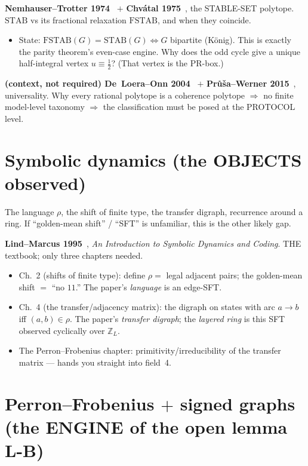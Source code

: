 \textbf{Nemhauser--Trotter 1974}~\cite{NemhauserTrotter1974} $+$ \textbf{Chv\'atal
1975}~\cite{Chvatal1975}, the STABLE-SET polytope. $\mathrm{STAB}$ vs its fractional
relaxation $\mathrm{FSTAB}$, and when they coincide.
\begin{itemize}[itemsep=1pt]
  \item State: $\mathrm{FSTAB}(G)=\mathrm{STAB}(G)\Leftrightarrow G$ bipartite
    (K\"onig). This is exactly the parity theorem's even-case engine. Why does the
    odd cycle give a unique half-integral vertex $u\equiv\tfrac12$? (That vertex is
    the PR-box.)
\end{itemize}

\textbf{(context, not required) De~Loera--Onn 2004}~\cite{DeLoeraOnn2004} $+$
\textbf{Pr\r{u}\v{s}a--Werner 2015}~\cite{PrusaWerner2015}, universality. Why every
rational polytope is a coherence polytope $\Rightarrow$ no finite model-level
taxonomy $\Rightarrow$ the classification must be posed at the PROTOCOL level.

\section{Symbolic dynamics (the OBJECTS observed)}

The language $\rho$, the shift of finite type, the transfer digraph, recurrence
around a ring. If ``golden-mean shift'' / ``SFT'' is unfamiliar, this is the other
likely gap.

\textbf{Lind--Marcus 1995}~\cite{LindMarcus1995}, \emph{An Introduction to Symbolic
Dynamics and Coding}. THE textbook; only three chapters needed.
\begin{itemize}[itemsep=1pt]
  \item Ch.~2 (shifts of finite type): define $\rho=$ legal adjacent pairs; the
    golden-mean shift $=$ ``no $11$.'' The paper's \emph{language} is an edge-SFT.
  \item Ch.~4 (the transfer/adjacency matrix): the digraph on states with arc
    $a\to b$ iff $(a,b)\in\rho$. The paper's \emph{transfer digraph}; the
    \emph{layered ring} is this SFT observed cyclically over $\mathbb Z_L$.
  \item The Perron--Frobenius chapter: primitivity/irreducibility of the transfer
    matrix --- hands you straight into field~4.
\end{itemize}

\section{Perron--Frobenius $+$ signed graphs (the ENGINE of the open lemma L-B)}

